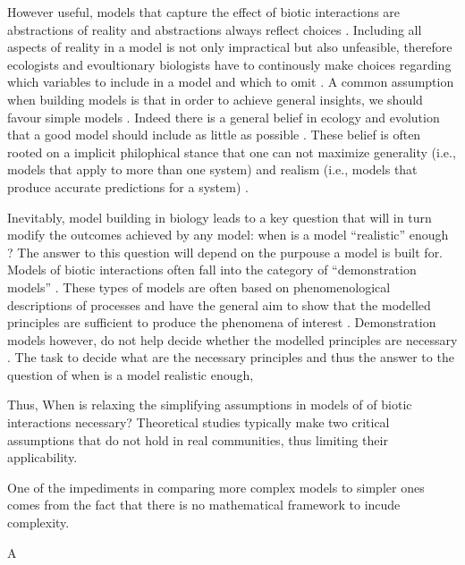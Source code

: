 \documentclass[12pt]{article}
\begin{document}
However useful, models that capture the effect of biotic interactions are abstractions of reality and abstractions always reflect choices \citep{levins2006strategies}. Including all aspects of reality in a model is not only impractical but also unfeasible, therefore ecologists and evoultionary biologists have to continously make choices regarding which variables to include in a model and which to omit \citep{evans2012predictive}. A common assumption when building models is that in order to achieve general insights, we should favour simple models \citep{evans2013simple}. Indeed there is a general belief in ecology and evolution that a good model should include as little as possible \citep{evans2013simple,orzack2012philosophy}. These belief is often rooted on a implicit philophical stance that one can not maximize generality (i.e., models that apply to more than one system) and realism (i.e., models that produce accurate predictions for a system) \citep{levins2006strategies,evans2012predictive}.


Inevitably, model building in biology leads to a key question that will in turn modify the outcomes achieved by any model: when is a model ``realistic'' enough \citep{stouffer2019all}? The answer to this question will depend on the purpouse a model is built for. Models of biotic interactions often fall into the category of ``demonstration models'' . These types of models are often based on phenomenological descriptions of processes and have the general aim to show that the modelled principles are sufficient to produce the phenomena of interest \citep{evans2013simple}.  Demonstration models however, do not help decide whether the modelled principles are necessary \citep{evans2013simple}. The task to decide what are the necessary principles and thus the answer to the question of when is a model realistic enough, 



Thus, When is relaxing the simplifying assumptions in models of  of biotic interactions necessary? Theoretical studies typically make two critical assumptions that do not hold in real communities, thus limiting their applicability.


One of the impediments in comparing more complex models to simpler ones comes from the fact that there is no mathematical framework to incude complexity.


A

\end{document}
